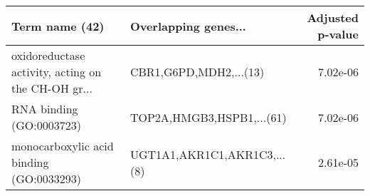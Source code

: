 \begin{tabular}{llr}
\toprule
                                    Term name (42) &        Overlapping genes... &  Adjusted p-value \\
\midrule
oxidoreductase activity, acting on the CH-OH gr... &      CBR1,G6PD,MDH2,...(13) &          7.02e-06 \\
                          RNA binding (GO:0003723) &   TOP2A,HMGB3,HSPB1,...(61) &          7.02e-06 \\
          monocarboxylic acid binding (GO:0033293) & UGT1A1,AKR1C1,AKR1C3,...(8) &          2.61e-05 \\
\bottomrule
\end{tabular}

